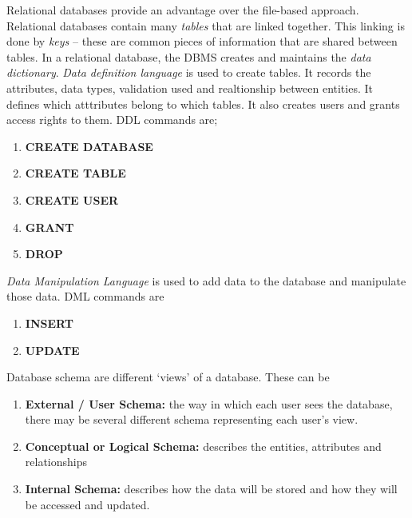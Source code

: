 \documentclass{article}
\begin{document}
\noindent Relational databases provide an advantage over the file-based
approach. Relational databases contain many \textit{tables} that are linked
together. This linking is done by \textit{keys} -- these are common pieces of
information that are shared between tables. In a relational database, the DBMS
creates and maintains the \textit{data dictionary}. \textit{Data definition
language} is used to create tables. It records the attributes, data types, validation used and realtionship between entities. It defines which atttributes
belong to which tables. It also creates users and grants access rights to them.
DDL commands are;\begin{enumerate}

    \item \textbf{CREATE DATABASE}
    
    \item \textbf{CREATE TABLE}
    
    \item \textbf{CREATE USER}
    
    \item \textbf{GRANT}
    
    \item \textbf{DROP}

\end{enumerate}

\noindent \textit{Data Manipulation Language} is used to add data to the
database and manipulate those data. DML commands are\begin{enumerate}

    \item \textbf{INSERT}
    
    \item \textbf{UPDATE}

\end{enumerate}

Database schema are different `views' of a database. These can
be\begin{enumerate}

    \item \textbf{External / User Schema:} the way in which each user sees the
        database, there may be several different schema representing each user's
        view.
    
    \item \textbf{Conceptual or Logical Schema:} describes the entities,
        attributes and relationships
    
    \item \textbf{Internal Schema:} describes how the data will be stored and
        how they will be accessed and updated.

\end{enumerate}
\end{document}
